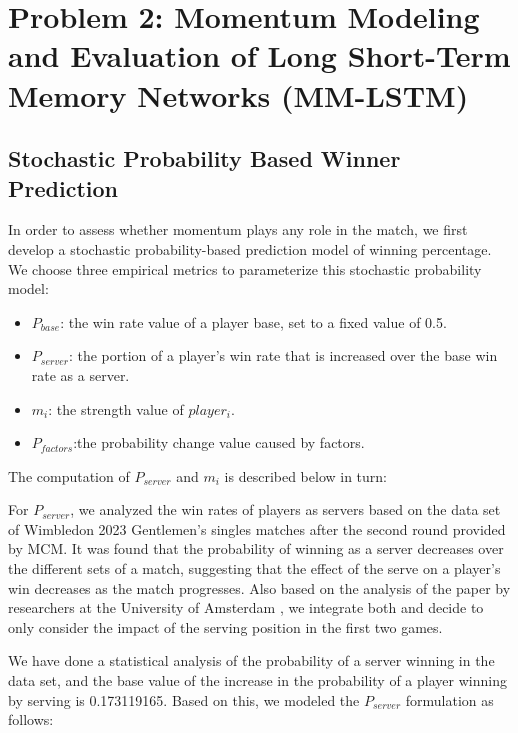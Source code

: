 
\section{Problem 2: Momentum Modeling and Evaluation of Long Short-Term Memory Networks (MM-LSTM)}

\subsection{Stochastic Probability Based Winner Prediction}

In order to assess whether momentum plays any role in the match, we first develop a stochastic probability-based prediction model of winning percentage. We choose three empirical metrics to parameterize this stochastic probability model:
\begin{itemize}[label=\textbf{\normalsize$\bullet$}]
    \item $P_{base}$: the win rate value of a player base, set to a fixed value of 0.5.
    \item $P_{server}$: the portion of a player's win rate that is increased over the base win rate as a server.
    \item $m_i$: the strength value of $player_i$.
    \item $P_{factors}$:the probability change value caused by factors.
\end{itemize}

The computation of $P_{server}$ and $m_i$ is described below in turn:

For $P_{server}$, we analyzed the win rates of players as servers based on the data set of Wimbledon 2023 Gentlemen's singles matches after the second round provided by MCM. It was found that the probability of winning as a server decreases over the different sets of a match, suggesting that the effect of the serve on a player's win decreases as the match progresses. Also based on the analysis of the paper by researchers at the University of Amsterdam \cite{p_server}, we integrate both and decide to only consider the impact of the serving position in the first two games.

We have done a statistical analysis of the probability of a server winning in the data set, and the base value of the increase in the probability of a player winning by serving is 0.173119165. Based on this, we modeled the $P_{server}$ formulation as follows:


